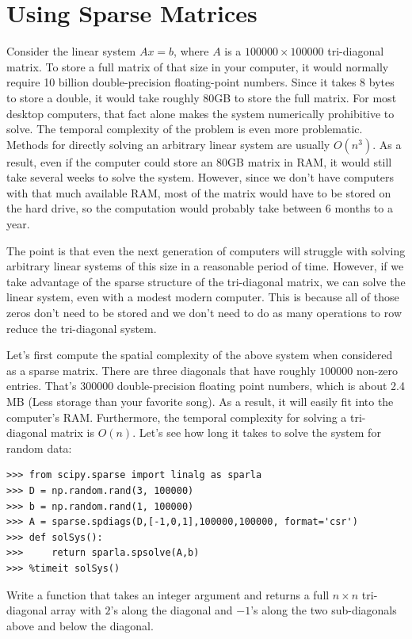 \section*{Using Sparse Matrices}
Consider the linear system $A x = b$, where $A$ is a $100000\times 100000$ tri-diagonal matrix.
To store a full matrix of that size in your computer, it would normally require 10
billion double-precision floating-point numbers.  Since it takes 8
bytes to store a double, it would take roughly 80GB to store the
full matrix.  For most desktop computers, that fact alone makes the
system numerically prohibitive to solve.
The temporal complexity of the problem is even more problematic.
Methods for directly solving an arbitrary linear system are usually $O(n^3)$.
As a result, even if the computer could store an 80GB matrix in RAM, it
would still take several weeks to solve the system.  However, since
we don't have computers with that much available RAM, most of the
matrix would have to be stored on the hard drive, so the computation
would probably take between $6$ months to a year.

The point is that even the next generation of computers will
struggle with solving arbitrary linear systems of this size in a
reasonable period of time.  However, if we take advantage of the
sparse structure of the tri-diagonal matrix, we can solve the linear
system, even with a modest modern computer.  This is because all of
those zeros don't need to be stored and we don't need to do as many
operations to row reduce the tri-diagonal system.

Let's first compute the spatial complexity of the above system when
considered as a sparse matrix.  There are three diagonals that have
roughly $100000$ non-zero entries.  That's $300000$
double-precision floating point numbers, which is about 2.4 MB (Less
storage than your favorite song).  As a result, it will easily
fit into the computer's RAM.  Furthermore, the temporal complexity for solving
a tri-diagonal matrix is $O(n)$. Let's see how long it takes to
solve the system for random data:
\begin{lstlisting}
>>> from scipy.sparse import linalg as sparla
>>> D = np.random.rand(3, 100000)
>>> b = np.random.rand(1, 100000)
>>> A = sparse.spdiags(D,[-1,0,1],100000,100000, format='csr')
>>> def solSys():
>>>     return sparla.spsolve(A,b)
>>> %timeit solSys()
\end{lstlisting}

\begin{problem}
Write a function that takes an integer argument  and returns a full $n\times n$
tri-diagonal array with $2$'s along the diagonal and $-1$'s along
the two sub-diagonals above and below the diagonal.
\label{prob:full_tridiag}
\end{problem}

